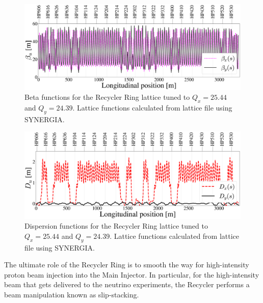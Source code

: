 \begin{figure}[H]
   \centering
   \includegraphics[width=\columnwidth]{chapter3/betas.png}
   \caption{Beta functions for the Recycler Ring lattice tuned to $Q_x=25.44$ and $Q_y=24.39$. Lattice functions calculated from lattice file using SYNERGIA.}
   \label{fig:rrbetas}
\end{figure}

\begin{figure}[H]
   \centering
   \includegraphics[width=\columnwidth]{chapter3/disps.png}
   \caption{Dispersion functions for the Recycler Ring lattice tuned to $Q_x=25.44$ and $Q_y=24.39$. Lattice functions calculated from lattice file using SYNERGIA.}
   \label{fig:rrdisps}
\end{figure}

The ultimate role of the Recycler Ring is to smooth the way for high-intensity proton beam injection into the Main Injector. In particular, for the high-intensity beam that gets delivered to the neutrino experiments, the Recycler performs a beam manipulation known as slip-stacking.   \cite{pipII1} \cite{rr2} \cite{fermi_rookie}

